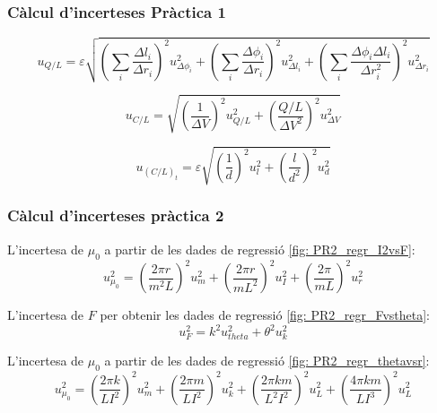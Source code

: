 \documentclass[11pt]{article}
\numberwithin{equation}{section}
\numberwithin{figure}{section}
\numberwithin{table}{section}
\begin{document}
\subsubsection{Càlcul d'incerteses Pràctica 1}
\begin{equation}
    u_{Q/L} = \varepsilon \sqrt{
        \left( \sum_i \frac{\Delta l_i}{\Delta r_i} \right)^2 u^2_{\Delta \phi_i} +
        \left( \sum_i \frac{\Delta \phi_i}{\Delta r_i} \right)^2 u^2_{\Delta l_i} +
        \left( \sum_i \frac{\Delta \phi_i \Delta l_i}{\Delta r_i^2} \right)^2 u^2_{\Delta r_i}}
        \label{eq: ins_q}
\end{equation}


\begin{equation}
    u_{C/L} = \sqrt{
        \left( \frac{1}{\Delta V} \right)^2 u^2_{Q/L} +
        \left( \frac{Q/L}{\Delta V^2} \right)^2 u^2_{\Delta V}}
    \label{eq: ins_c}
\end{equation}

\begin{equation}
    u_{(C/L)_t} = \varepsilon \sqrt{
    \left( \frac{1}{d} \right)^2 u^2_l +
    \left( \frac{l}{d^2} \right)^2 u^2_d}
    \label{eq: ins_ct}
\end{equation}

\subsubsection{Càlcul d'incerteses pràctica 2}\label{sec: PR2_calcul_incerteses}

L'incertesa de $\mu_0$ a partir de les dades de regressió \ref{fig: PR2_regr_I2vsF}:
\begin{equation}
    u_{\mu_0}^2 = \left(\frac{2\pi r}{m^2L}\right)^2u_m^2 + \left(\frac{2\pi r}{mL^2}\right)^2u_I^2 + \left(\frac{2\pi}{mL}\right)^2u_r^2
\end{equation}

L'incertesa de $F$ per obtenir les dades de regressió \ref{fig: PR2_regr_Fvstheta}:
\begin{equation}
    u_{F}^2 = k^2u_{theta}^2 + \theta^2u_{k}^2
\end{equation}

L'incertesa de $\mu_0$ a partir de les dades de regressió \ref{fig: PR2_regr_thetavsr}:
\begin{equation}
    u_{\mu_0}^2 = \left(\frac{2\pi k}{LI^2}\right)^2u_m^2 + \left(\frac{2\pi m}{LI^2}\right)^2u_k^2 + \left(\frac{2\pi km}{L^2I^2}\right)^2u_L^2 + \left(\frac{4\pi km}{LI^3}\right)^2u_L^2
\end{equation}
\end{document}

